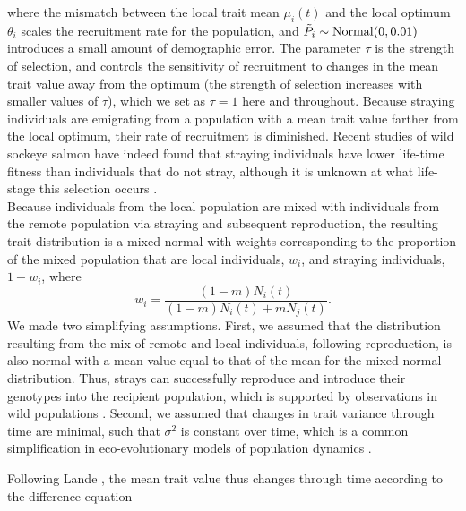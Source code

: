 \documentclass{revtex4}
\begin{document}
\noindent where the mismatch between the local trait mean $\mu_i(t)$ and the local optimum $\theta_i$ scales the recruitment rate for the population, and $\tilde{P}_i\sim {\rm Normal}(0,0.01)$ introduces a small amount of demographic error.
The parameter $\tau$ is the strength of selection, and controls the sensitivity of recruitment to changes in the mean trait value away from the optimum (the strength of selection increases with smaller values of $\tau$), which we set as $\tau=1$ here and throughout.
Because straying individuals are emigrating from a population with a mean trait value farther from the local optimum, their rate of recruitment is diminished.
Recent studies of wild sockeye salmon have indeed found that straying individuals have lower life-time fitness than individuals that do not stray, although it is unknown at what life-stage this selection occurs \citep{Peterson:2014gy}.
\\


Because individuals from the local population are mixed with individuals from the remote population via straying and subsequent reproduction, the resulting trait distribution is a mixed normal with weights corresponding to the proportion of the mixed population that are local individuals, $w_i$, and straying individuals, $1-w_i$, where 
\begin{equation}
w_i=\frac{(1-m)N_i(t)}{(1-m) N_i(t) + m N_j(t)}.
\end{equation}
We made two simplifying assumptions.
First, we assumed that the distribution resulting from the mix of remote and local individuals, following reproduction, is also normal with a mean value equal to that of the mean for the mixed-normal distribution.
Thus, strays can successfully reproduce and introduce their genotypes into the recipient population, which is supported by observations in wild populations \citep{Jasper:2013cc}.
Second, we assumed that changes in trait variance through time are minimal, such that $\sigma^2$ is constant over time, which is a common simplification in eco-evolutionary models of population dynamics \citep{Lande:1976ga,Schreiber:2011wx,Gilbert:2014ee,Gibert:2015kc}.



Following Lande \citep{Lande:1976ga}, the mean trait value thus changes through time according to the difference equation
\end{document}
